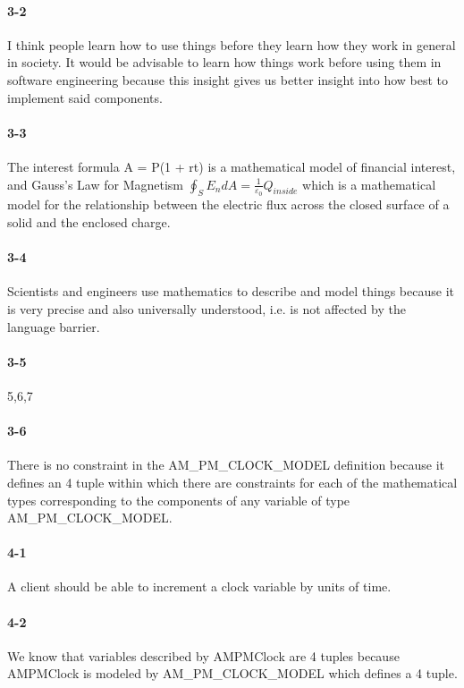 \documentclass[10pt]{article}
\begin{document}
\paragraph{3-2} I think people learn how to use things before they learn how they work in general in society. It would be advisable to learn how things work before using them in software engineering because this insight gives us better insight into how best to implement said components. 

\paragraph{3-3} The interest formula A = P(1 + rt) is a mathematical model of financial interest, and Gauss's Law for Magnetism $\oint_S {E_n dA = \frac{1}{{\varepsilon _0 }}} Q_{inside}$ which is a mathematical model for the relationship between the electric flux across the closed surface of a solid and the enclosed charge. 

\paragraph{3-4} Scientists and engineers use mathematics to describe and model things because it is very precise and also universally understood, i.e. is not affected by the language barrier. 
\paragraph{3-5} 5,6,7
\paragraph{3-6} There is no constraint in the AM\_PM\_CLOCK\_MODEL definition because it defines an 4 tuple within which there are constraints for each of the mathematical types corresponding to the components of any variable of type AM\_PM\_CLOCK\_MODEL. 
\paragraph{4-1} A client should be able to increment a clock variable by units of time. 

\paragraph{4-2} We know that variables described by AMPMClock are 4 tuples because AMPMClock is modeled by AM\_PM\_CLOCK\_MODEL which defines a 4 tuple. 
\end{document}

